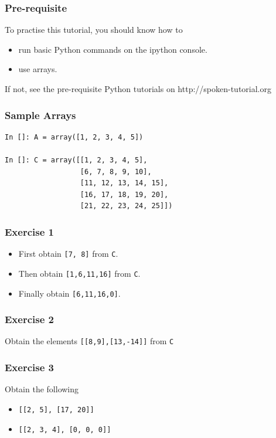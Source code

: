 \documentclass[17pt]{beamer}
\begin{document}
\begin{frame}
\frametitle{Pre-requisite}
\label{sec-3}
To practise this tutorial, you should know how to 
\begin{itemize}
\item run basic Python commands on the ipython console.
\item use arrays.
\end{itemize}
If not, see the pre-requisite Python tutorials on {\color{blue}http://spoken-tutorial.org}
\end{frame}

\begin{frame}[fragile]
\frametitle{Sample Arrays}
\label{sec-4}
\lstset{language=Python}
\begin{footnotesize}
\begin{lstlisting}
In []: A = array([1, 2, 3, 4, 5])

In []: C = array([[1, 2, 3, 4, 5],
                  [6, 7, 8, 9, 10],
                  [11, 12, 13, 14, 15],
                  [16, 17, 18, 19, 20],
                  [21, 22, 23, 24, 25]])
\end{lstlisting}
\end{footnotesize}
\end{frame}

\begin{frame}
\frametitle{Exercise 1}
\label{sec-8}

\begin{itemize}
\item First obtain \texttt{[7, 8]} from \texttt{C}.
\item Then obtain \texttt{[1,6,11,16]} from \texttt{C}.
\item Finally obtain \texttt{[6,11,16,0]}.
\end{itemize}
\end{frame}
\begin{frame}
\frametitle{Exercise 2}
\label{sec-9}

  Obtain the elements \texttt{[[8,9],[13,-14]]} from \texttt{C}
\end{frame}

\begin{frame}[fragile]
\frametitle{Exercise 3}
\label{sec-11}

  Obtain the following
\begin{itemize}
\item \texttt{[[2, 5], [17, 20]]}\pause
\item \texttt{[[2, 3, 4], [0, 0, 0]]}
\end{itemize}
\end{frame}
\end{document}
